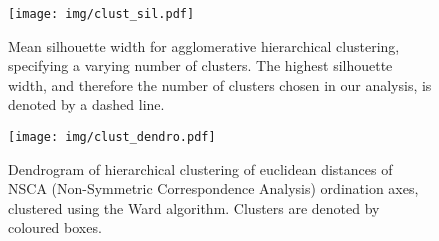 \documentclass[11pt,a4paper]{article}
\begin{document}




\begin{figure}[H]
\centering
	\texttt{[image: img/clust\_sil.pdf]}
	\caption{Mean silhouette width for agglomerative hierarchical clustering, specifying a varying number of clusters. The highest silhouette width, and therefore the number of clusters chosen in our analysis, is denoted by a dashed line.}
	\label{clust_sil}
\end{figure}

\begin{figure}[H]
\centering
	\texttt{[image: img/clust\_dendro.pdf]}
	\caption{Dendrogram of hierarchical clustering of euclidean distances of NSCA (Non-Symmetric Correspondence Analysis) ordination axes, clustered using the Ward algorithm. Clusters are denoted by coloured boxes.}
	\label{clust_dendro}
\end{figure}


\end{document}
